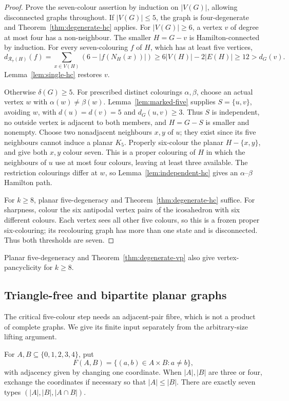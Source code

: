 \documentclass[11pt]{article}
\theoremstyle{remark}
\newcommand{\R}{\mathcal R}
\numberwithin{equation}{section}
\begin{document}
\begin{proof}
Prove the seven-colour assertion by induction on $|V(G)|$, allowing
disconnected graphs throughout.  If $|V(G)|\le5$, the graph is
four-degenerate and Theorem~\ref{thm:degenerate-hc} applies.
For $|V(G)|\ge6$, a vertex $v$ of degree at most four has a
non-neighbour.  The smaller $H=G-v$ is Hamilton-connected by induction.
For every seven-colouring $f$ of $H$, which has at least five vertices,
\[
 d_{\R_7(H)}(f)
 =\sum_{x\in V(H)}(6-|f(N_H(x))|)
 \ge6|V(H)|-2|E(H)|\ge12>d_G(v).
\]
Lemma~\ref{lem:single-hc} restores $v$.

Otherwise $\delta(G)\ge5$.  For prescribed distinct colourings
$\alpha,\beta$, choose an actual vertex $w$ with
$\alpha(w)\ne\beta(w)$.  Lemma~\ref{lem:marked-five} supplies
$S=\{u,v\}$, avoiding $w$, with $d(u)=d(v)=5$ and
$d_G(u,v)\ge3$.  Thus $S$ is independent, no outside vertex is
adjacent to both members, and $H=G-S$ is smaller and nonempty.
Choose two nonadjacent neighbours $x,y$ of $u$; they exist since its
five neighbours cannot induce a planar $K_5$.  Properly six-colour the
planar $H-\{x,y\}$, and give both $x,y$ colour seven.  This is a
proper colouring of $H$ in which the neighbours of $u$ use at most
four colours, leaving at least three available.  The restriction
colourings differ at $w$, so Lemma~\ref{lem:independent-hc} gives
an $\alpha$--$\beta$ Hamilton path.

For $k\ge8$, planar five-degeneracy and
Theorem~\ref{thm:degenerate-hc} suffice.  For sharpness, colour the
six antipodal vertex pairs of the icosahedron with six different
colours.  Each vertex sees all other five colours, so this is a frozen
proper six-colouring; its recolouring graph has more than one state and
is disconnected.  Thus both thresholds are seven.
\end{proof}

Planar five-degeneracy and Theorem~\ref{thm:degenerate-vp} also give
vertex-pancyclicity for $k\ge8$.

\subsection{Triangle-free and bipartite planar graphs}

The critical five-colour step needs an adjacent-pair fibre, which is
not a product of complete graphs.  We give its finite input separately
from the arbitrary-size lifting argument.

For $A,B\subseteq\{0,1,2,3,4\}$, put
\[
 F(A,B)=\{(a,b)\in A\times B:a\ne b\},
\]
with adjacency given by changing one coordinate.  When $|A|,|B|$ are
three or four, exchange the coordinates if necessary so that
$|A|\le|B|$.  There are exactly seven types
$(|A|,|B|,|A\cap B|)$.
\end{document}
